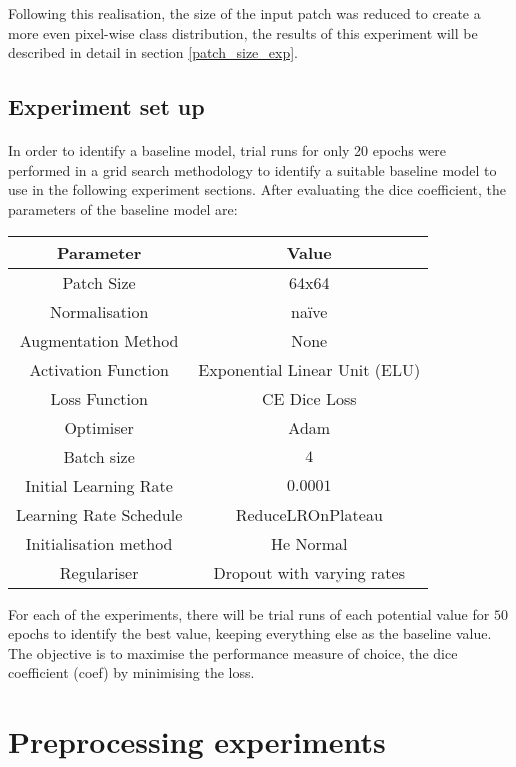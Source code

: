 Following this realisation, the size of the input patch was reduced to create a more even pixel-wise class distribution, the results of this experiment will be described in detail in section \ref{patch_size_exp}.

\subsection{Experiment set up}
\paragraph{}
In order to identify a baseline model, trial runs for only 20 epochs were performed in a grid search methodology to identify a suitable baseline model to use in the following experiment sections. After evaluating the dice coefficient, the parameters of the baseline model are:

\begin{center}
    \begin{tabular}{c|c}     
    \textbf{Parameter} & \textbf{Value}  \\
    \hline
    Patch Size
    & 64x64 \\
    \hline
    Normalisation
    & na\"ive \\
    \hline
    Augmentation Method
    & None \\
    \hline
    Activation Function
    & Exponential Linear Unit (ELU) \\
    \hline
    Loss Function
    & CE Dice Loss\\
    \hline
    Optimiser
    & Adam \\
    \hline
    Batch size
    & $4$ \\
    \hline
    Initial Learning Rate
    & $0.0001$ \\
    \hline
    Learning Rate Schedule
    & ReduceLROnPlateau \\
    \hline
    Initialisation method
    & He Normal \\
    \hline
    Regulariser
    & Dropout with varying rates \\
    \end{tabular}
\end{center}

For each of the experiments, there will be trial runs of each potential value for $50$ epochs to identify the best value, keeping everything else as the baseline value. The objective is to maximise the performance measure of choice, the dice coefficient (coef) by minimising the loss.
\section{Preprocessing experiments}
